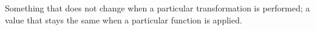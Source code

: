 Something that does not change when a particular
transformation is performed; a value that stays 
the same when a particular function is applied.